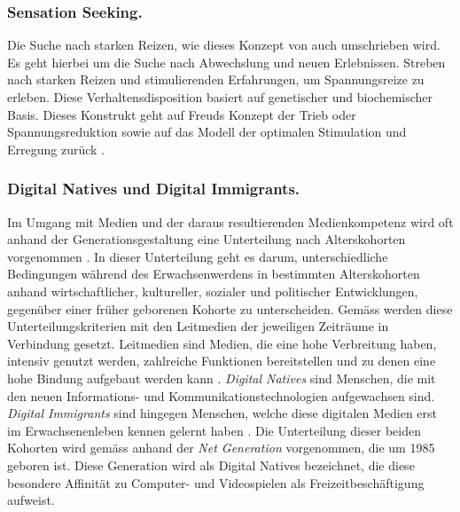 \subsubsection{Sensation Seeking.}
Die Suche nach starken Reizen, wie dieses Konzept von  auch umschrieben wird. Es geht hierbei um die Suche nach Abwechslung und neuen Erlebnissen. Streben nach starken Reizen und stimulierenden Erfahrungen, um Spannungsreize zu erleben. Diese Verhaltensdisposition basiert auf genetischer und biochemischer Basis. Dieses Konstrukt geht auf Freuds Konzept der Trieb oder Spannungsreduktion sowie auf das Modell der optimalen Stimulation und Erregung zurück \cite{Doernhaus2014}. 

\subsubsection{Digital Natives und Digital Immigrants.} Im Umgang mit Medien und der daraus resultierenden Medienkompetenz wird oft anhand der Generationsgestaltung eine Unterteilung nach Alterskohorten vorgenommen \cite{Suss2013}. In dieser Unterteilung geht es darum, unterschiedliche Bedingungen während des Erwachsenwerdens in bestimmten Alterskohorten anhand wirtschaftlicher, kultureller, sozialer und politischer Entwicklungen, gegenüber einer früher geborenen Kohorte zu unterscheiden. Gemäss  werden diese Unterteilungskriterien mit den Leitmedien der jeweiligen Zeiträume in Verbindung gesetzt. Leitmedien sind Medien, die eine hohe Verbreitung haben, intensiv genutzt werden, zahlreiche Funktionen bereitstellen und zu denen eine hohe Bindung aufgebaut werden kann \cite{Suss2013}. \textit{Digital Natives} sind Menschen, die mit den neuen Informations- und Kommunikationstechnologien aufgewachsen sind. \textit{Digital Immigrants} sind hingegen Menschen, welche diese digitalen Medien erst im Erwachsenenleben kennen gelernt haben \cite{Prensky2001}. Die Unterteilung dieser beiden Kohorten wird gemäss  anhand der \textit{Net Generation} vorgenommen, die um 1985 geboren ist. Diese Generation wird als Digital Natives bezeichnet, die diese besondere Affinität zu Computer- und Videospielen als Freizeitbeschäftigung aufweist.

